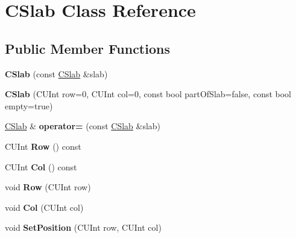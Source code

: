 \hypertarget{classCSlab}{\section{C\-Slab Class Reference}
\label{classCSlab}
}
\subsection*{Public Member Functions}
\begin{DoxyCompactItemize}
\item 
\hypertarget{classCSlab_a78323aeb9b867b56c5ec46174f5379b6}{{\bfseries C\-Slab} (const \hyperlink{classCSlab}{C\-Slab} \&slab)}\label{classCSlab_a78323aeb9b867b56c5ec46174f5379b6}

\item 
\hypertarget{classCSlab_abd74b162e714d6ec9f6b049ff4e32aa6}{{\bfseries C\-Slab} (C\-U\-Int row=0, C\-U\-Int col=0, const bool part\-Of\-Slab=false, const bool empty=true)}\label{classCSlab_abd74b162e714d6ec9f6b049ff4e32aa6}

\item 
\hypertarget{classCSlab_a20e487ca68e69810cd34a2775d03f23e}{\hyperlink{classCSlab}{C\-Slab} \& {\bfseries operator=} (const \hyperlink{classCSlab}{C\-Slab} \&slab)}\label{classCSlab_a20e487ca68e69810cd34a2775d03f23e}

\item 
\hypertarget{classCSlab_ac00a40725a72a34c05b01d6a9a19e8a6}{C\-U\-Int {\bfseries Row} () const }\label{classCSlab_ac00a40725a72a34c05b01d6a9a19e8a6}

\item 
\hypertarget{classCSlab_a0681fc1f984691e6d0eb43515c179cfe}{C\-U\-Int {\bfseries Col} () const }\label{classCSlab_a0681fc1f984691e6d0eb43515c179cfe}

\item 
\hypertarget{classCSlab_afb073bcd8717a05be1b308001b967f6c}{void {\bfseries Row} (C\-U\-Int row)}\label{classCSlab_afb073bcd8717a05be1b308001b967f6c}

\item 
\hypertarget{classCSlab_a5ae44b90c30e868bb63e5fc90bcbbe26}{void {\bfseries Col} (C\-U\-Int col)}\label{classCSlab_a5ae44b90c30e868bb63e5fc90bcbbe26}

\item 
\hypertarget{classCSlab_a14b5fa52b52ad1c32228b815bd7779b3}{void {\bfseries Set\-Position} (C\-U\-Int row, C\-U\-Int col)}\label{classCSlab_a14b5fa52b52ad1c32228b815bd7779b3}


\end{DoxyCompactItemize}
